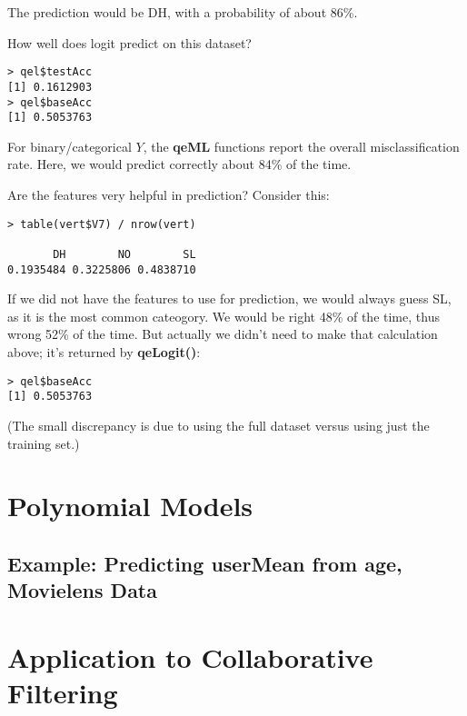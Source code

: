 The prediction would be DH, with a probability of about 86\%.

How well does logit predict on this dataset?

\begin{lstlisting}
> qel$testAcc
[1] 0.1612903
> qel$baseAcc
[1] 0.5053763
\end{lstlisting}


For binary/categorical $Y$, the \textbf{qeML} functions report the
overall misclassification rate.  Here, we would predict correctly about
84\% of the time. 

Are the features very helpful in prediction?  Consider this:

\begin{lstlisting}
> table(vert$V7) / nrow(vert)

       DH        NO        SL 
0.1935484 0.3225806 0.4838710 
\end{lstlisting}

If we did not have the features to use for prediction, we would always
guess SL, as it is the most common cateogory.  We would be right 48\% of
the time, thus wrong 52\% of the time.  But actually we didn't need to
make that calculation above; it's returned by \textbf{qeLogit()}:

\begin{lstlisting}
> qel$baseAcc
[1] 0.5053763
\end{lstlisting}

(The small discrepancy is due to using the full dataset versus using
just the training set.)

\section{Polynomial Models}

\subsection{Example:  Predicting userMean from age, Movielens Data}

\section{Application to Collaborative Filtering}

